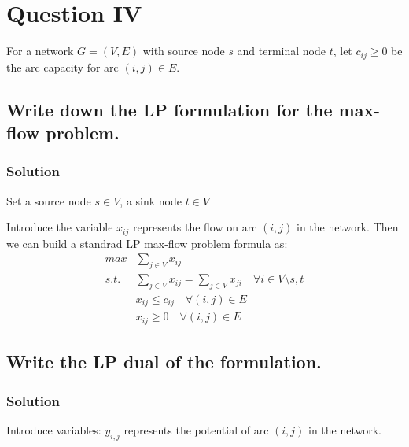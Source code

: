\documentclass[11pt]{article}
\begin{document}
    \hypertarget{question-iv}{%
\section{Question IV}\label{question-iv}}

For a network \(G = (V,E)\) with source node \(s\) and terminal node
\(t\), let \(c_{ij} \geq 0\) be the arc capacity for arc \((i,j)\in E\).

\hypertarget{write-down-the-lp-formulation-for-the-max-flow-problem.}{%
\subsection{Write down the LP formulation for the max-flow
problem.}\label{write-down-the-lp-formulation-for-the-max-flow-problem.}}

\hypertarget{solution}{%
\subsubsection{Solution}\label{solution}}

Set a source node \(s\in V\), a sink node \(t\in V\)

Introduce the variable \(x_{ij}\) represents the flow on arc \((i,j)\)
in the network. Then we can build a standrad LP max-flow problem formula
as: \[ \begin{align*}
max &\sum_{j \in V} x_{ij}
\\ s.t. &\sum_{j \in V} x_{ij} = \sum_{j \in V} x_{ji} \quad \forall i \in V\setminus {s,t}
\\ &x_{ij} \leq c_{ij} \quad \forall (i,j) \in E
\\ &x_{ij} \geq 0 \quad \forall (i,j) \in E \end{align*}\]

\hypertarget{write-the-lp-dual-of-the-formulation.}{%
\subsection{Write the LP dual of the
formulation.}\label{write-the-lp-dual-of-the-formulation.}}

\hypertarget{solution-1}{%
\subsubsection{Solution}\label{solution-1}}

Introduce variables: \(y_{i,j}\) represents the potential of arc
\({(i,j)}\) in the network.
\end{document}
